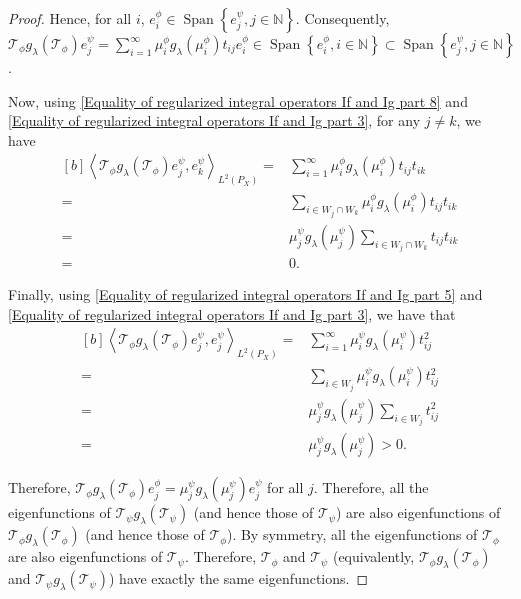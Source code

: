 \documentclass{article} %
\newcommand{\repone}{\phi}
\newcommand{\reptwo}{\psi}
\newcommand{\Tone}{\mathcal{T}_{\repone}}
\newcommand{\Ttwo}{\mathcal{T}_{\reptwo}}
\newcommand{\gl}{g_{\lambda}}
\newcommand{\inprod}[1]{\left \langle #1 \right\rangle}
\newcommand{\LPtwo}{L^{2}(P_{X})}
\theoremstyle{plain}
\begin{document}
\begin{proof}
    Hence, for all $i$, $e_{i}^{\repone} \in \operatorname{Span}\left\{e_{j}^{\reptwo}, j \in \mathbb{N}\right\}$. Consequently, $\Tone \gl(\Tone) e_{j}^{\reptwo} = \sum_{i=1}^{\infty} \mu_{i}^{\repone}\gl(\mu_{i}^{\repone})t_{ij}e_{i}^{\repone} \in \operatorname{Span}\left\{e_{i}^{\repone}, i \in \mathbb{N}\right\} \subset \operatorname{Span}\left\{e_{j}^{\reptwo}, j \in \mathbb{N}\right\}$. 

    Now, using \eqref{Equality of regularized integral operators If and Ig part 8} and \eqref{Equality of regularized integral operators If and Ig part 3}, for any $j \neq k$, we have
    \begin{equation*}
        \begin{aligned}[b]
            \inprod{\Tone \gl(\Tone)e_{j}^{\reptwo},e_{k}^{\reptwo}}_{\LPtwo} =& \sum_{i=1}^{\infty} \mu_{i}^{\repone}\gl(\mu_{i}^{\repone})t_{ij}t_{ik}\\
            =& \sum_{i \in W_{j}\cap W_{k}} \mu_{i}^{\repone}\gl(\mu_{i}^{\repone})t_{ij}t_{ik}\\
            =& \mu_{j}^{\reptwo} \gl(\mu_{j}^{\reptwo}) \sum_{i \in W_{j}\cap W_{k}} t_{ij}t_{ik}\\
            =&0.
        \end{aligned}
    \end{equation*}

    Finally, using \eqref{Equality of regularized integral operators If and Ig part 5} and \eqref{Equality of regularized integral operators If and Ig part 3}, we have that
    \begin{equation*}
        \begin{aligned}[b]
            \inprod{\Tone \gl(\Tone)e_{j}^{\reptwo},e_{j}^{\reptwo}}_{\LPtwo} =& \sum_{i=1}^{\infty} \mu_{i}^{\reptwo}\gl(\mu_{i}^{\reptwo})t_{ij}^{2}\\
            =& \sum_{i \in W_{j}}\mu_{i}^{\reptwo}\gl(\mu_{i}^{\reptwo})t_{ij}^{2}\\
            = &\mu_{j}^{\reptwo}\gl(\mu_{j}^{\reptwo})\sum_{i \in W_{j}}t_{ij}^{2}\\
            =&\mu_{j}^{\reptwo}\gl(\mu_{j}^{\reptwo}) > 0.
        \end{aligned}
    \end{equation*}

    Therefore, $\Tone\gl(\Tone) e_{j}^{\repone}=\mu_{j}^{\reptwo}\gl(\mu_{j}^{\reptwo})  e_{j}^{\reptwo}$ for all $j$. Therefore, all the eigenfunctions of $\Ttwo \gl(\Ttwo)$ (and hence those of $\Ttwo$) are also eigenfunctions of $\Tone \gl(\Tone)$ (and hence those of $\Tone$). By symmetry, all the eigenfunctions of $\Tone$ are also eigenfunctions of $\Ttwo$. Therefore, $\Tone$ and $\Ttwo$ (equivalently, $\Tone \gl(\Tone)$ and $\Ttwo \gl(\Ttwo)$) have exactly the same eigenfunctions.


\end{proof}
\end{document}
